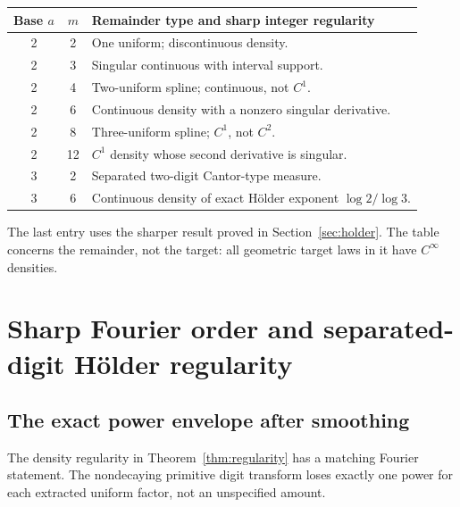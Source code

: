 \documentclass[11pt,a4paper]{article}
\theoremstyle{definition}
\theoremstyle{remark}
\begin{document}
\begin{center}
\begin{tabular}{@{}cc>{\raggedright\arraybackslash}p{9.0cm}@{}}
\toprule
Base $a$ & $m$ & Remainder type and sharp integer regularity\\
\midrule
2 & 2 & One uniform; discontinuous density.\\
2 & 3 & Singular continuous with interval support.\\
2 & 4 & Two-uniform spline; continuous, not $C^1$.\\
2 & 6 & Continuous density with a nonzero singular derivative.\\
2 & 8 & Three-uniform spline; $C^1$, not $C^2$.\\
2 & 12 & $C^1$ density whose second derivative is singular.\\
3 & 2 & Separated two-digit Cantor-type measure.\\
3 & 6 & Continuous density of exact H\"older exponent $\log 2/\log 3$.\\
\bottomrule
\end{tabular}
\end{center}
The last entry uses the sharper result proved in
Section~\ref{sec:holder}. The table concerns the remainder, not the target:
all geometric target laws in it have $C^\infty$ densities.

\section{Sharp Fourier order and separated-digit H\"older regularity}
\label{sec:fourier}

\subsection{The exact power envelope after smoothing}
The density regularity in Theorem~\ref{thm:regularity} has a matching
Fourier statement. The nondecaying primitive digit transform loses exactly
one power for each extracted uniform factor, not an unspecified amount.
\end{document}
